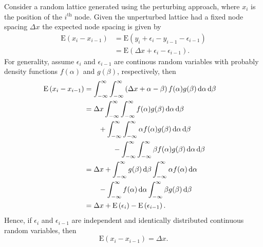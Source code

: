 \documentclass[11pt,a4paper]{article}
\begin{document}
		Consider a random lattice generated using the perturbing approach, where $x_i$ is the position of the $i^\text{th}$ node. Given the unperturbed lattice had a fixed node spacing $\Delta x$ the expected node spacing is given by
		\begin{align*}
			\mathrm{E} \left(x_i - x_{i-1} \right) &= \mathrm{E} \left(y_i + \epsilon_i - y_{i-1} - \epsilon_{i-1} \right) \\
			&= \mathrm{E} \left(\Delta x + \epsilon_i - \epsilon_{i-1} \right).
		\end{align*}
		For generality, assume $\epsilon_i$ and $\epsilon_{i-1}$ are continous random variables with probably density functions $f(\alpha)$ and $g(\beta)$, respectively, then
		\begin{align*}
			\phantom{\mathrm{E} \left(x_i - x_{i-1} \right)}
			&\begin{aligned}
				\mathllap{\mathrm{E} \left(x_i - x_{i-1} \right)} &= \int_{-\infty}^{\infty} \int_{-\infty}^{\infty} \left (\Delta x + \alpha - \beta\right) f(\alpha) g(\beta) \,\mathrm{d}\alpha \, \mathrm{d}\beta
			\end{aligned} \\
			&\begin{aligned}
				&= \Delta x \int_{-\infty}^{\infty} \int_{-\infty}^{\infty} f(\alpha) g(\beta) \,\mathrm{d}\alpha \, \mathrm{d}\beta \\
					&\qquad + \int_{-\infty}^{\infty} \int_{-\infty}^{\infty} \alpha f(\alpha) g(\beta) \,\mathrm{d}\alpha \, \mathrm{d}\beta \\
						&\qquad\qquad - \int_{-\infty}^{\infty} \int_{-\infty}^{\infty} \beta f(\alpha) g(\beta) \,\mathrm{d}\alpha \, \mathrm{d}\beta
			\end{aligned} \\
			&\begin{aligned}
				&= \Delta x + \int_{-\infty}^{\infty} g(\beta) \, \mathrm{d}\beta \int_{-\infty}^{\infty} \alpha f(\alpha) \,\mathrm{d}\alpha \\
					&\qquad - \int_{-\infty}^{\infty} f(\alpha) \,\mathrm{d}\alpha \int_{-\infty}^{\infty} \beta g(\beta) \,\mathrm{d}\beta
			\end{aligned} \\
			&= \Delta x + \mathrm{E} \left(\epsilon_i \right) - \mathrm{E} \left(\epsilon_{i-1} \right).
		\end{align*}
		Hence, if $\epsilon_i$ and $\epsilon_{i-1}$ are independent and identically distributed continuous random variables, then
		\begin{equation*}
			\mathrm{E} \left(x_i - x_{i-1} \right) = \Delta x.
		\end{equation*}
\end{document}
